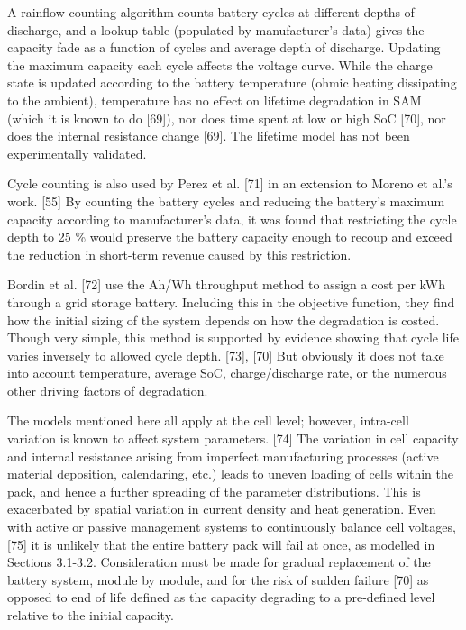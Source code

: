 \documentclass[report_18month.tex]{subfiles}
\begin{document}
A rainflow counting algorithm counts battery cycles at different depths of discharge, and a lookup table (populated by manufacturer’s data) gives the capacity fade as a function of cycles and average depth of discharge. Updating the maximum capacity each cycle affects the voltage curve. While the charge state is updated according to the battery temperature (ohmic heating dissipating to the ambient), temperature has no effect on lifetime degradation in SAM (which it is known to do [69]), nor does time spent at low or high SoC [70], nor does the internal resistance change [69]. The lifetime model has not been experimentally validated.

Cycle counting is also used by Perez et al. [71] in an extension to Moreno et al.’s work. [55] By counting the battery cycles and reducing the battery’s maximum capacity according to manufacturer’s data, it was found that restricting the cycle depth to 25 \% would preserve the battery capacity enough to recoup and exceed the reduction in short-term revenue caused by this restriction.

Bordin et al. [72] use the Ah/Wh throughput method to assign a cost per kWh through a grid storage battery. Including this in the objective function, they find how the initial sizing of the system depends on how the degradation is costed. Though very simple, this method is supported by evidence showing that cycle life varies inversely to allowed cycle depth. [73], [70] But obviously it does not take into account temperature, average SoC, charge/discharge rate, or the numerous other driving factors of degradation.

The models mentioned here all apply at the cell level; however, intra-cell variation is known to affect system parameters. [74] The variation in cell capacity and internal resistance arising from imperfect manufacturing processes (active material deposition, calendaring, etc.) leads to uneven loading of cells within the pack, and hence a further spreading of the parameter distributions. This is exacerbated by spatial variation in current density and heat generation. Even with active or passive management systems to continuously balance cell voltages, [75] it is unlikely that the entire battery pack will fail at once, as modelled in Sections 3.1-3.2. Consideration must be made for gradual replacement of the battery system, module by module, and for the risk of sudden failure [70] as opposed to end of life defined as the capacity degrading to a pre-defined level relative to the initial capacity.

\subsection{}
\end{document}
